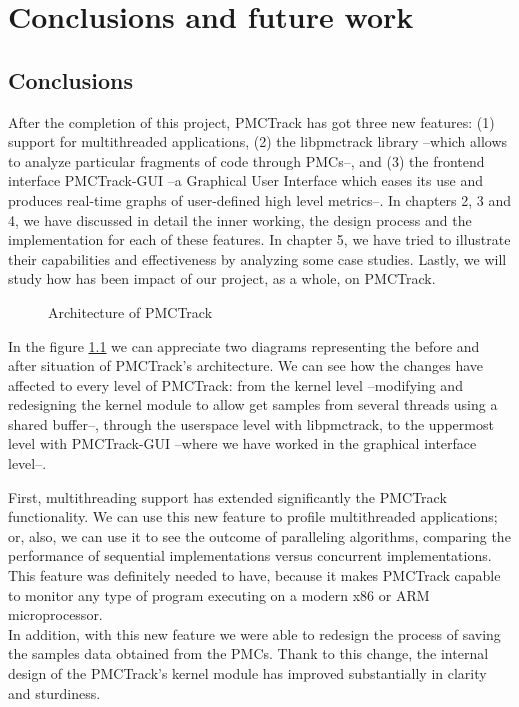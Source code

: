 \chapter{Conclusions and future work}


\section{Conclusions}

After the completion of this project, PMCTrack has got three new features: (1) support for multithreaded applications, (2) the libpmctrack library --which allows to analyze particular fragments of code through PMCs--, and (3) the frontend interface PMCTrack-GUI --a Graphical User Interface which eases its use and produces real-time graphs of user-defined high level metrics--. In chapters 2, 3 and 4, we have discussed in detail the inner working, the design process and the implementation for each of these features. In chapter 5, we have tried to illustrate their capabilities and effectiveness by analyzing some case studies. Lastly, we will study how has been impact of our project, as a whole, on PMCTrack.

\begin{figure}%
    \centering
    \qquad
\caption{Architecture of PMCTrack}%
\label{fig:beforeandafter}%
\end{figure}

In the figure \ref{fig:beforeandafter} we can appreciate two diagrams representing the before and after situation of PMCTrack's architecture. We can see how the changes have affected to every level of PMCTrack: from the kernel level --modifying and redesigning the kernel module to allow get samples from several threads using a shared buffer--, through the userspace level with libpmctrack, to the uppermost level with PMCTrack-GUI --where we have worked in the graphical interface level--.

First, multithreading support has extended significantly the PMCTrack functionality. We can use this new feature to profile multithreaded applications; or, also, we can use it to see the outcome of paralleling algorithms, comparing the performance of sequential implementations versus concurrent implementations. This feature was definitely needed to have, because it makes PMCTrack capable to monitor any type of program executing on a modern x86 or ARM microprocessor.\\%
In addition, with this new feature we were able to redesign the process of saving the samples data obtained from the PMCs. Thank to this change, the internal design of the PMCTrack's kernel module has improved substantially in clarity and sturdiness.

